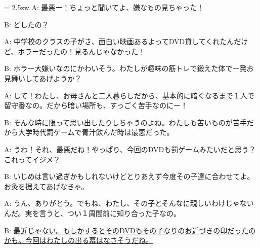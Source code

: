\documentclass[11pt]{amsart}
\title{}
\author{}
\newenvironment{hangall}[1]{\hangindent = 2.5zw\everypar{\hangindent = 2.5zw}}{}
\begin{document}
\maketitle
\begin{hangall}{}%
A: 最悪ー！ちょっと聞いてよ、嫌なもの見ちゃった！

B: どしたの？

A: 中学校のクラスの子がさ、面白い映画あるよってDVD貸してくれたんだけど、ホラーだったの！見るんじゃなかった！

B: ホラー大嫌いなのにかわいそう。わたしが趣味の筋トレで鍛えた体で一発お見舞いしてあげようか？

A: して！わたし、お母さんと二人暮らしだから、基本的に暗くなるまで１人で留守番なの。だから暗い場所も、すっごく苦手なのにー！

B: そんな時に限って思い出したりしちゃうのよね。わたしも苦いものが苦手だから大学時代罰ゲームで青汁飲んだ時は最悪だった。

A: うわ！それ、最悪だね！やっぱり、今回のDVDも罰ゲームみたいだと思う？これってイジメ？

B: いじめは言い過ぎかもしれないけどとりあえず今度その子達に合わせてよ。お灸を据えてあげなきゃ。

A: うん、ありがとう。でもね、わたし、その子とそんなに親しいわけじゃないんだ。実を言うと、つい１周間前に知り合った子なの。

B: \ul{最近じゃない。もしかするとそのDVDもその子なりのお近づきの印だったのかも。今回はわたしの出る幕はなさそうだね。}\end{hangall}
\end{document}
